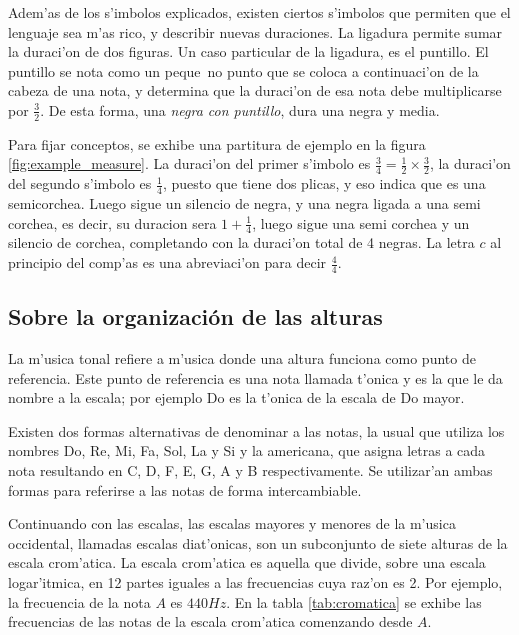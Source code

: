 Adem'as de los s'imbolos explicados, existen ciertos s'imbolos que permiten que el lenguaje sea m'as rico, y describir nuevas duraciones. La ligadura
permite sumar la duraci'on de dos figuras. Un caso particular de la ligadura, es el puntillo. El puntillo se nota como un peque~no punto que se coloca a 
continuaci'on de la cabeza de una nota, y determina que la duraci'on de esa nota debe multiplicarse por $\frac{3}{2}$. 
De esta forma, una \emph{negra con puntillo}, dura una negra y media. 

Para fijar conceptos, se exhibe una partitura de ejemplo en la figura \ref{fig:example_measure}. 
La duraci'on del primer s'imbolo es $\frac{3}{4}=\frac{1}{2}\times\frac{3}{2}$,
la duraci'on del segundo s'imbolo es $\frac{1}{4}$, puesto que tiene dos plicas, y eso indica que es una semicorchea. Luego sigue un silencio de negra,
y una negra ligada a una semi corchea, es decir, su duracion sera $1 + \frac{1}{4}$, luego sigue una semi corchea y un silencio de corchea, completando
con la duraci'on total de 4 negras. La letra $c$ al principio del comp'as es una abreviaci'on para decir $\frac{4}{4}$.

\begin{imagen}
    \width{12.5cm}
\end{imagen}

\subsection{Sobre la organizaci\'on de las alturas}
La m'usica tonal refiere a m'usica donde una altura funciona como punto de referencia. Este punto de referencia es una nota llamada t'onica y es
la que le da nombre a la escala; por ejemplo Do es la t'onica de la escala de Do mayor. 

Existen dos formas alternativas de denominar a las notas, la usual que utiliza los nombres Do, Re, Mi, Fa, Sol, La y Si y la americana, que 
asigna letras a cada nota resultando en C, D, F, E, G, A y B respectivamente. Se utilizar'an ambas formas para referirse a las notas de forma
intercambiable. 

Continuando con las escalas, las escalas mayores y menores de la m'usica occidental, llamadas escalas diat'onicas, 
son un subconjunto de siete alturas de la escala crom'atica.
La escala crom'atica es aquella que divide, sobre una escala logar'itmica, en 12 partes iguales a las frecuencias cuya raz'on es 2. Por ejemplo, 
la frecuencia de la nota $A$ es $440Hz$. En la tabla \ref{tab:cromatica} se exhibe las frecuencias de las notas de la escala crom'atica 
comenzando desde $A$.

